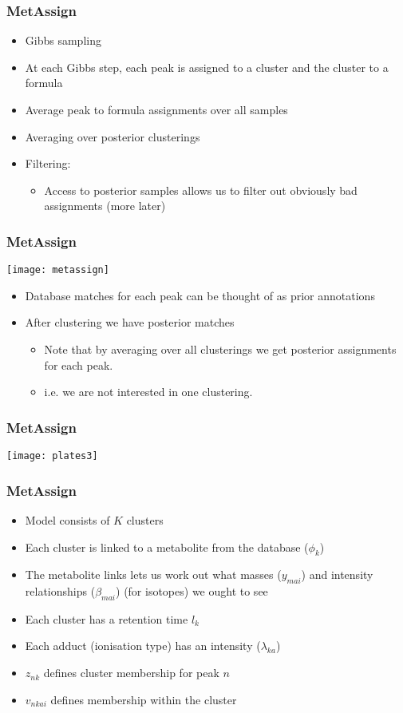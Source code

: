 \begin{frame}
	\frametitle{MetAssign}
	\begin{itemize}
		\item Gibbs sampling
		\item At each Gibbs step, each peak is assigned to a cluster and the cluster to a formula
		\item Average peak to formula assignments over all samples
		\item Averaging over posterior clusterings
		\item<2-> Filtering:
		\begin{itemize}
			\item Access to posterior samples allows us to filter out obviously bad assignments (more later)
		\end{itemize}
	\end{itemize}
\end{frame}

\begin{frame}
	\frametitle{MetAssign}
	\texttt{[image: metassign]}
	\begin{itemize}
		\item Database matches for each peak can be thought of as prior annotations
		\item After clustering we have posterior matches
		\begin{itemize}
			\item Note that by averaging over all clusterings we get posterior assignments for each peak.
			\item i.e. we are not interested in one clustering.
		\end{itemize}
	\end{itemize}
\end{frame}


\begin{frame}
	\frametitle{MetAssign}
	\centering\texttt{[image: plates3]}
\end{frame}

\begin{frame}
	\frametitle{MetAssign}
	\begin{itemize}
		\item Model consists of $K$ clusters
		\item Each cluster is linked to a metabolite from the database ($\phi_k$)
		\item The metabolite links lets us work out what masses ($y_{mai}$) and intensity relationships ($\beta_{mai}$) (for isotopes) we ought to see
		\item Each cluster has a retention time $l_k$
		\item Each adduct (ionisation type) has an intensity ($\lambda_{ka}$)
		\item $z_{nk}$ defines cluster membership for peak $n$
		\item $v_{nkai}$ defines membership within the cluster
	\end{itemize}
\end{frame}

